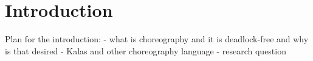 \chapter{Introduction}

Plan for the introduction:
- what is choreography and it is deadlock-free and why is that desired
- Kalas and other choreography language
- research question






